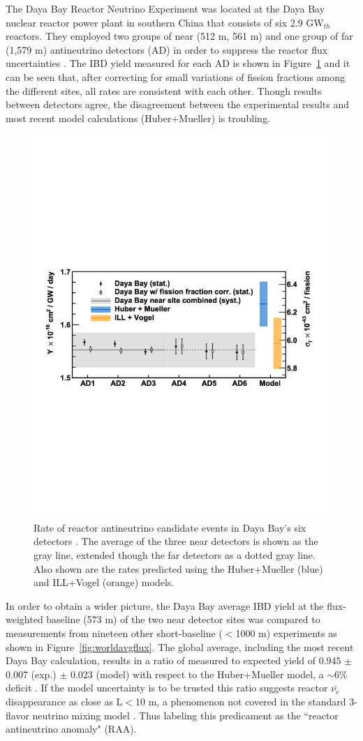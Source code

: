 The Daya Bay Reactor Neutrino Experiment was located at the Daya Bay nuclear reactor power plant in southern China that consists of six 2.9 GW$_{th}$ reactors. They employed two groups of near (512 m, 561 m) and one group of far (1,579 m) antineutrino detectors (AD) in order to suppress the reactor flux uncertainties \cite{An:2015qga,DayaBayAnomaly}.
The IBD yield measured for each AD is shown in Figure~\ref{fig:dayabayflux} and it can be seen that, after correcting for small variations of fission fractions among the different sites, all rates are consistent with each other. Though results between detectors agree, the disagreement between the experimental results and most recent model calculations (Huber+Mueller) is troubling. 

\begin{figure}[h]
	\centering
	\includegraphics[width=0.7\linewidth]{tex/3-reactorneutrinos-images/DayaBayFlux}
	\caption[Daya Bay $\bar{\nu_{e}}$ flux.]{Rate of reactor antineutrino candidate events in Daya Bay's six detectors \cite{DayaBayAnomaly}. The average of the three near detectors is shown as the gray line, extended though the far detectors as a dotted gray line. Also shown are the rates predicted using the Huber+Mueller (blue) and ILL+Vogel (orange) models.}
	\label{fig:dayabayflux}
\end{figure}

In order to obtain a wider picture, the Daya Bay average IBD yield at the flux-weighted baseline (573 m) of the two near detector sites was compared to measurements from nineteen other short-baseline ($<$1000 m) experiments as shown in Figure~\ref{fig:worldavgflux}. 
The global average, including the most recent Daya Bay calculation, results in a ratio of measured to expected yield of 0.945 $\pm$ 0.007 (exp.) $\pm$ 0.023 (model) with respect to the Huber+Mueller model, a $\sim$6\% deficit \cite{DayaBayFlux2018}.
If the model uncertainty is to be trusted this ratio suggests reactor $\bar{\nu_{e}}$ disappearance as close as L$<$10 m, a phenomenon not covered in the standard 3-flavor neutrino mixing model \cite{HayesVogel}.  
Thus labeling this predicament as the ``reactor antineutrino anomaly" (RAA). 

